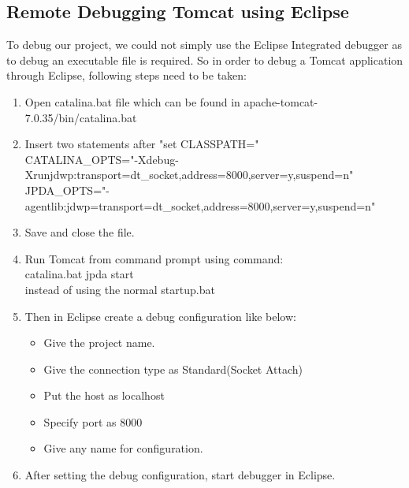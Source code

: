 \documentclass[amsart, 12pt]{article}
\begin{document}
\subsection{Remote Debugging Tomcat using Eclipse}
To debug our project, we could not simply use the Eclipse Integrated debugger as to debug an executable file is required. So in order to debug a Tomcat application through Eclipse, following steps need to be taken:
\begin{enumerate}
    \item Open catalina.bat file which can be found in apache-tomcat-7.0.35/bin/catalina.bat
\item Insert two statements after "set CLASSPATH=" \\
CATALINA\_OPTS="-Xdebug-Xrunjdwp:transport=dt\_socket,address=8000,server=y,suspend=n"\\
JPDA\_OPTS="-agentlib:jdwp=transport=dt\_socket,address=8000,server=y,suspend=n"
\item Save and close the file. 
\item Run Tomcat from command prompt using command: \\
catalina.bat jpda start \\
instead of using the normal startup.bat
\item Then in Eclipse create a debug configuration like below:

\begin{itemize}
    \item Give the project name.
\item Give the connection type as Standard(Socket Attach)
\item Put the host as localhost
\item Specify port as 8000
\item Give any name for configuration.
\end{itemize}

\item After setting the debug configuration, start debugger in Eclipse.
\end{enumerate}
  
\end{document}
